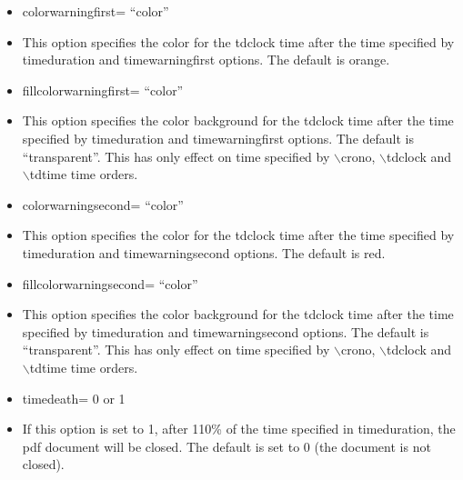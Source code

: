 \documentclass{article}
\begin{document}
\begin{itemize}
\item  colorwarningfirst= ``color''
\item[]
This option specifies the color for the tdclock time after the time specified by
timeduration and timewarningfirst options. The default is orange.

\item  fillcolorwarningfirst= ``color''
\item[]
This option specifies the color background for the tdclock time after the time specified by
timeduration and timewarningfirst options. The default is ``transparent''.
This has only effect on time specified by $\backslash$crono, $\backslash$tdclock and $\backslash$tdtime
time orders.

\item  colorwarningsecond= ``color''
\item[]
This option specifies the color for the tdclock time after the time specified by
timeduration and timewarningsecond options. The default is red.

\item  fillcolorwarningsecond= ``color''
\item[]
This option specifies the color background for the tdclock time after the time specified by
timeduration and timewarningsecond options. The default is ``transparent''.
This has only effect on time specified by $\backslash$crono, $\backslash$tdclock and $\backslash$tdtime
time orders.

\item  timedeath= 0 or 1
\item[]
If this option is set to 1, after 110\% of the time specified in  timeduration,
the pdf document will be closed.  The default is set to 0 (the document is not closed).


\end{itemize}
\end{document}
